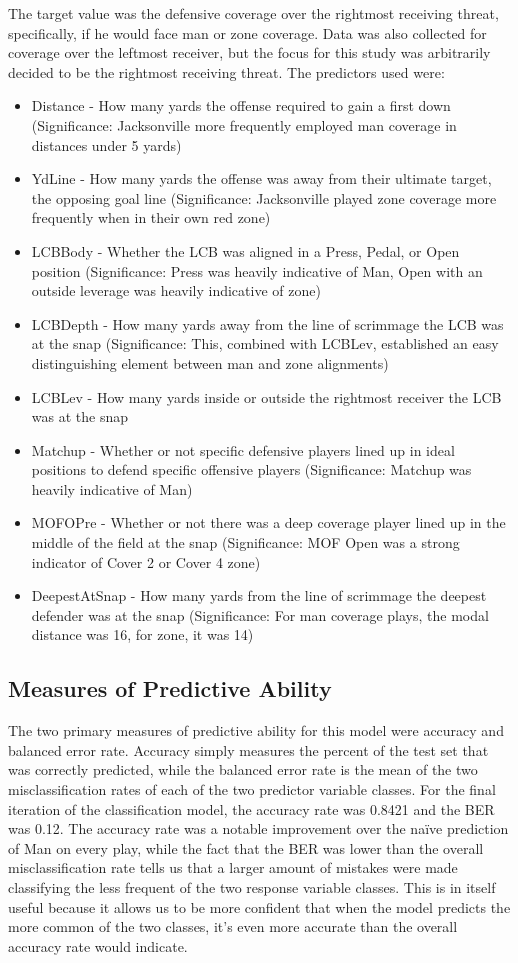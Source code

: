 \documentclass{article}
\begin{document}
The target value was the defensive coverage over the rightmost receiving threat, specifically, if he would face man or zone coverage. Data was also collected for coverage over the leftmost receiver, but the focus for this study was arbitrarily decided to be the rightmost receiving threat. The predictors used were:
\begin{itemize}
    \item Distance	- How many yards the offense required to gain a first down (Significance: Jacksonville more frequently employed man coverage in distances under 5 yards)
    \item YdLine		- How many yards the offense was away from their ultimate target, the opposing goal line (Significance: Jacksonville played zone coverage more frequently when in their own red zone)
    \item LCBBody	- Whether the LCB was aligned in a Press, Pedal, or Open position (Significance: Press was heavily indicative of Man, Open with an outside leverage was heavily indicative of zone)
    \item LCBDepth	- How many yards away from the line of scrimmage the LCB was at the snap (Significance: This, combined with LCBLev,  established an easy distinguishing element between man and zone alignments)
    \item LCBLev		- How many yards inside or outside the rightmost receiver the LCB was at the snap
    \item Matchup	- Whether or not specific defensive players lined up in ideal positions to defend specific offensive players (Significance: Matchup was heavily indicative of Man)
    \item MOFOPre	- Whether or not there was a deep coverage player lined up in the middle of the field at the snap (Significance: MOF Open was a strong indicator of Cover 2 or Cover 4 zone)
    \item DeepestAtSnap	- How many yards from the line of scrimmage the deepest defender was at the snap (Significance: For man coverage plays, the modal distance was 16, for zone, it was 14)
\end{itemize}

\subsection{Measures of Predictive Ability}
The two primary measures of predictive ability for this model were accuracy and balanced error rate. Accuracy simply measures the percent of the test set that was correctly predicted, while the balanced error rate is the mean of the two misclassification rates of each of the two predictor variable classes. For the final iteration of the classification model, the accuracy rate was 0.8421 and the BER was 0.12. The accuracy rate was a notable improvement over the naïve prediction of Man on every play, while the fact that the BER was lower than the overall misclassification rate tells us that a larger amount of mistakes were made classifying the less frequent of the two response variable classes. This is in itself useful because it allows us to be more confident that when the model predicts the more common of the two classes, it’s even more accurate than the overall accuracy rate would indicate. 
\end{document}
